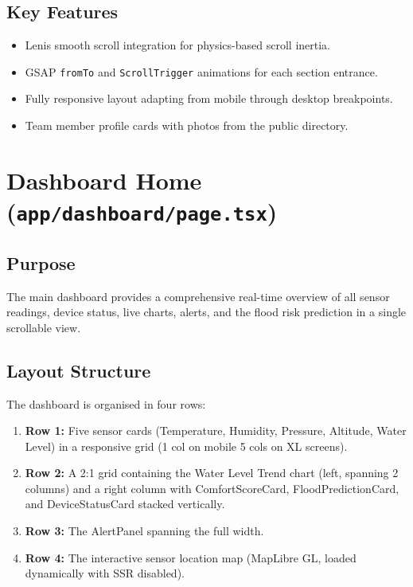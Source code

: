 \subsection{Key Features}
\begin{itemize}[leftmargin=1.5em]
  \item Lenis smooth scroll integration for physics-based scroll inertia.
  \item GSAP \texttt{fromTo} and \texttt{ScrollTrigger} animations for each section entrance.
  \item Fully responsive layout adapting from mobile through desktop breakpoints.
  \item Team member profile cards with photos from the public directory.
\end{itemize}

\section{Dashboard Home (\texttt{app/\allowbreak{}dashboard/\allowbreak{}page.\allowbreak{}tsx})}

\subsection{Purpose}
The main dashboard provides a comprehensive real-time overview of all sensor readings, device status, live charts, alerts, and the flood risk prediction in a single scrollable view.

\subsection{Layout Structure}

The dashboard is organised in four rows:

\begin{enumerate}[leftmargin=1.5em]
  \item \textbf{Row 1:} Five sensor cards (Temperature, Humidity, Pressure, Altitude, Water Level) in a responsive grid (1 col on mobile \textrightarrow{} 5 cols on XL screens).
  \item \textbf{Row 2:} A 2:1 grid containing the Water Level Trend chart (left, spanning 2 columns) and a right column with ComfortScoreCard, FloodPredictionCard, and DeviceStatusCard stacked vertically.
  \item \textbf{Row 3:} The AlertPanel spanning the full width.
  \item \textbf{Row 4:} The interactive sensor location map (MapLibre GL, loaded dynamically with SSR disabled).
\end{enumerate}

